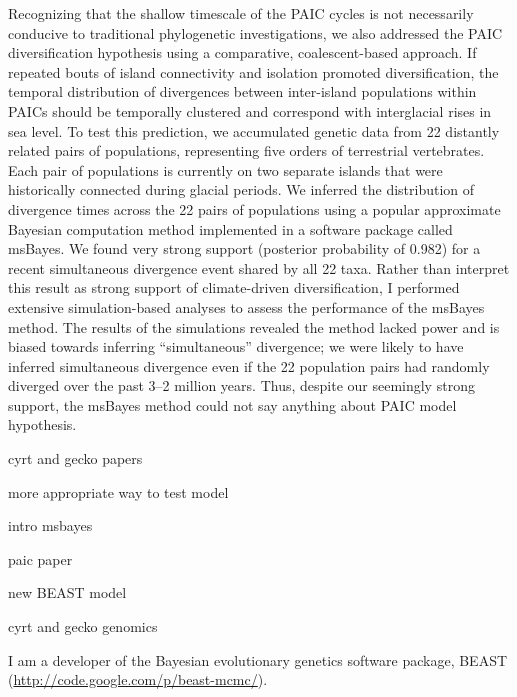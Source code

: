 \documentclass[10pt]{article}
\begin{document}
Recognizing that the shallow timescale of the PAIC cycles is not necessarily conducive to traditional phylogenetic investigations, we also addressed the PAIC diversification hypothesis using a comparative, coalescent-based approach.
If repeated bouts of island connectivity and isolation promoted diversification, the temporal distribution of divergences between inter-island populations within PAICs should be temporally clustered and correspond with interglacial rises in sea level.
To test this prediction, we accumulated genetic data from 22 distantly related pairs of populations, representing five orders of terrestrial vertebrates.
Each pair of populations is currently on two separate islands that were historically connected during glacial periods.
We inferred the distribution of divergence times across the 22 pairs of populations using a popular approximate Bayesian computation method implemented in a software package called msBayes.
We found very strong support (posterior probability of 0.982) for a recent simultaneous divergence event shared by all 22 taxa.
Rather than interpret this result as strong support of climate-driven diversification, I performed extensive simulation-based analyses to assess the performance of the msBayes method.
The results of the simulations revealed the method lacked power and is biased towards inferring ``simultaneous'' divergence; we were likely to have inferred simultaneous divergence even if the 22 population pairs had randomly diverged over the past 3--2 million years.
Thus, despite our seemingly strong support, the msBayes method could not say anything about PAIC model hypothesis.

cyrt and gecko papers

more appropriate way to test model

intro msbayes

paic paper

new BEAST model

cyrt and gecko genomics

I am a developer of the Bayesian evolutionary genetics software package, BEAST (\url{http://code.google.com/p/beast-mcmc/}).
\end{document}
